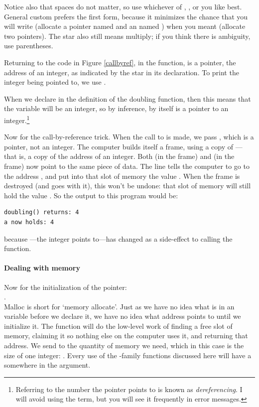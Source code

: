 \documentclass[12pt]{article}
\makeatletter
\def\ttind#1{\index{#1@\cinline{#1}}\cinline{#1}}
\def\ttindex#1{\index{#1@\cinline{#1}}}
\makeatother
\begin{document}
Notice also that spaces do not matter, so use whichever of , , or  you like best. General
custom prefers the first form, because it minimizes the chance that you
will write  (allocate a pointer named 
and an  named ) when you meant  (allocate two pointers). The star also
still means multiply; if you think there is ambiguity, use parentheses.

Returning to the code in Figure \ref{callbyref}, in the  function,  is a pointer,
the address of an integer, as indicated by the star in its
declaration. To print the integer being pointed to, we use . 

When we declare  in the definition of the doubling
function, then this means that the variable  will be an
integer, so by inference,  by itself is a pointer to an
integer.\footnote{Referring to the number the pointer points to is
known as {\sl dereferencing}. I will avoid using the term, but you will see it frequently in error messages.}

Now for the call-by-reference trick.
When the call to  is made, we pass , which is a
pointer, not an integer. The computer builds itself a frame, using a copy
of ---that is, a copy of the address of an integer. Both  (in the  frame) 
and  (in the  frame) now point to the same piece of data.
The line  tells the computer to go to the address , and put into that slot of
memory the value . When the frame is destroyed (and  goes with it), this won't be undone: that slot of memory will still
hold the value .  So the output to this program would be:
\begin{verbatim} 
doubling() returns: 4
a now holds: 4
\end{verbatim} 
because ---the integer  points to---has changed as a
side-effect to calling the  function.

\paragraph{Dealing with memory} Now for the initialization of the pointer:\\ 
.\\
Malloc is short for `memory allocate'. Just as we have no idea what
is in an  variable before we declare it, we have no
idea what address  points to until we initialize it. The
function  will do the low-level work of finding
a free slot of memory, claiming it so nothing else on the computer
uses it, and returning that address. We send to \ttind{malloc} the
quantity of memory we need, which in this case is the size of one
integer: . Every use of the -family
functions discussed here will have a  somewhere in the
argument.\ttindex{sizeof}
\end{document}
